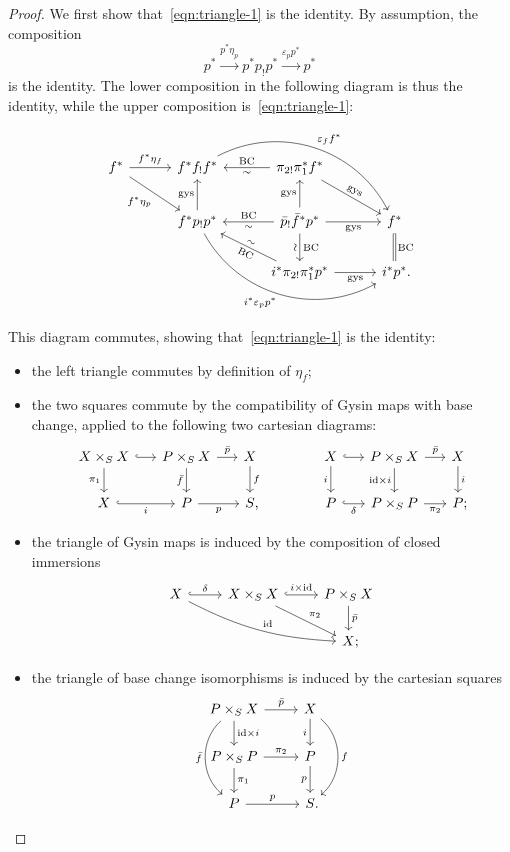 \documentclass{amsart}
\numberwithin{equation}{section}
\theoremstyle{plain}
\theoremstyle{definition}
\def\id{\mathrm{id}}
\let\epsilon=\varepsilon
\begin{document}
\begin{proof}
	We first show that~\eqref{eqn:triangle-1} is the identity.
	By assumption, the composition
	\[
	p^* \xrightarrow{p^*\eta_p} p^*p_!p^* \xrightarrow{\epsilon_pp^*} p^*
	\]
	is the identity. The lower composition in the following diagram is thus the identity, while the upper composition is~\eqref{eqn:triangle-1}:
	\[
	\begin{tikzcd}[column sep=3em,row sep=2em]
		f^* \ar{dr}[swap]{f^*\eta_p} \ar{r}{f^*\eta_f} & f^*f_!f^* \ar[<-]{r}{\mathrm{BC}}[swap]{\sim} \ar[bend left=45]{drr}{\epsilon_ff^*} & \pi_{2!}\pi_1^*f^* \ar{dr}[sloped]{\mathrm{gys}} & \\
		 & f^*p_!p^* \ar{u}{\mathrm{gys}} \ar[<-]{r}{\mathrm{BC}}[swap]{\sim} \ar[<-]{dr}[sloped]{\sim}[swap,sloped]{\mathrm{BC}} \ar[bend right=45]{drr}[swap]{i^*\epsilon_pp^*} & \bar p_!\bar f^*p^* \ar{u}{\mathrm{gys}} \ar{r}[swap]{\mathrm{gys}} \ar{d}{\mathrm{BC}}[swap,sloped]{\sim} & f^* \ar[equal]{d}{\mathrm{BC}} \\
		& & i^*\pi_{2!}\pi_1^*p^* \ar{r}[swap]{\mathrm{gys}} & i^*p^*\rlap.
	\end{tikzcd}
	\]
	This diagram commutes, showing that~\eqref{eqn:triangle-1} is the identity:
	\begin{itemize}
		\item the left triangle commutes by definition of $\eta_f$;
		\item the two squares commute by the compatibility of Gysin maps with base change, applied to the following two cartesian diagrams:
		\[
		\begin{tikzcd}[column sep=1.5em]
			X\times_SX \ar[hook]{r} \ar{d}[swap]{\pi_1} & P\times_SX \ar{r}{\bar p} \ar{d}[swap]{\bar f} & X \ar{d}{f} \\
			X \ar[hook]{r}[swap]{i} & P \ar{r}[swap]{p} & S\rlap,
		\end{tikzcd}
		\qquad\qquad
		\begin{tikzcd}[column sep=1.5em]
			X \ar[hook]{r} \ar{d}[swap]{i} & P\times_SX \ar{r}{\bar p} \ar{d}[swap]{\id\times i} & X \ar{d}{i} \\
			P \ar[hook]{r}[swap]{\delta} & P\times_SP \ar{r}[swap]{\pi_2} & P\rlap;
		\end{tikzcd}
		\]
		\item the triangle of Gysin maps is induced by the composition of closed immersions
		\[
		\begin{tikzcd}
			X \ar[hook]{r}{\delta} \ar[bend right=12]{drr}{\id} & X\times_SX \ar[hook]{r}{i\times\id} \ar{dr}{\pi_2} & P\times_S X \ar{d}{\bar p} \\
			& & X\rlap;
		\end{tikzcd}
		\]
		\item the triangle of base change isomorphisms is induced by the cartesian squares
		\[
		\begin{tikzcd}
			P\times_SX \ar{r}{\bar p} \ar{d}{\id\times i} \ar[bend right=50]{dd}[swap]{\bar f} & X \ar{d}[swap]{i} \ar[bend left=50]{dd}{f} \\
			P\times_SP \ar{r}{\pi_2} \ar{d}{\pi_1} & P \ar{d}[swap]{p} \\
			P \ar{r}{p} & S\rlap.
		\end{tikzcd}
		\]
	\end{itemize}
	

\end{proof}
\end{document}
